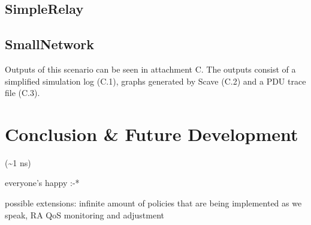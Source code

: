     \section{SimpleRelay}

    \section{SmallNetwork}

        Outputs of this scenario can be seen in attachment C. The outputs consist of a simplified simulation log (C.1), graphs generated by Scave (C.2) and a PDU trace file (C.3).

\chapter{Conclusion \& Future Development}
    (\textasciitilde1 ns)

    everyone's happy :-*

    possible extensions: infinite amount of policies that are being implemented as we speak, RA QoS monitoring and adjustment
